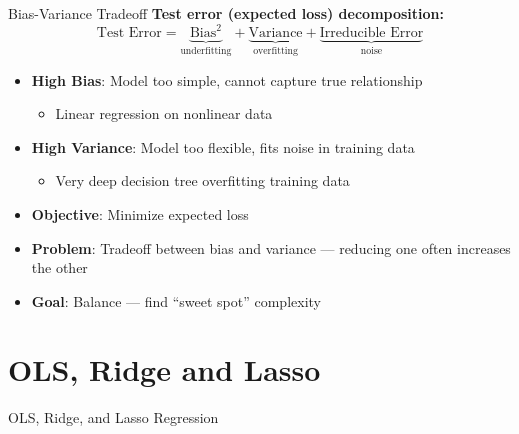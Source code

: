 \documentclass[11pt]{beamer}
\begin{document}
\begin{frame}[fragile]{Bias-Variance Tradeoff}
	\textbf{Test error (expected loss) decomposition:} \citep[pp. 148]{Bishop2016}
	\[
		\text{Test Error} = \underbrace{\text{Bias}^2}_{\text{underfitting}} + \underbrace{\text{Variance}}_{\text{overfitting}} + \underbrace{\text{Irreducible Error}}_{\text{noise}}
	\]

	\vspace{0.3cm}

	\begin{itemize}
		\setlength{\itemsep}{0.2cm}
		\item \textbf{High Bias}: Model too simple, cannot capture true relationship
		      \begin{itemize}
			      \small
			      \item Linear regression on nonlinear data
		      \end{itemize}
		\item \textbf{High Variance}: Model too flexible, fits noise in training data
		      \begin{itemize}
			      \small
			      \item Very deep decision tree overfitting training data
		      \end{itemize}
		\item \textbf{Objective}: Minimize expected loss
		\item \textbf{Problem}: Tradeoff between bias and variance --- reducing one often increases the other
		\item \textbf{Goal}: Balance --- find ``sweet spot'' complexity
	\end{itemize}
\end{frame}

\section{OLS, Ridge and Lasso}


\begin{frame}
	\begin{center}
		\Large
		OLS, Ridge, and Lasso Regression\\
	\end{center}
\end{frame}
\end{document}
